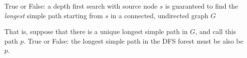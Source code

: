 \Needspace{1.5in}
\begin{prob}

    True or False: a depth first search with source node $s$ is guaranteed to
    find the \emph{longest} simple path starting from $s$ in a connected,
    undirected graph $G$

    That is, suppose that there is a unique longest simple path in $G$, and call this path $p$.
    True or False: the longest simple path in the DFS forest must be also be $p$.

    \tF{}

\end{prob}
